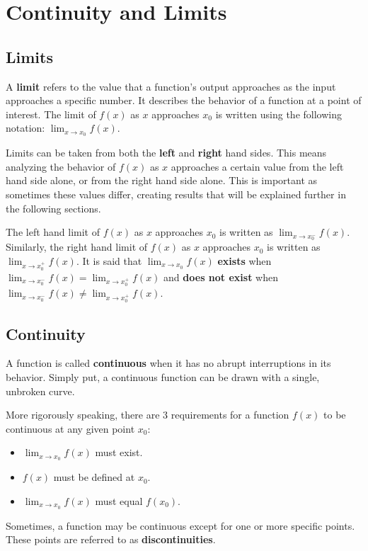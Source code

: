 \documentclass[11pt]{article}
\begin{document}
\section{Continuity and Limits}

\subsection{Limits}
A \textbf{limit} refers to the value that a function's output approaches as the input approaches a specific number. It describes the behavior of a function at a point of interest. The limit of $f(x)$ as $x$ approaches $x_0$ is written using the following notation: $\lim_{x\to x_0} f(x)$. 

Limits can be taken from both the \textbf{left} and \textbf{right} hand sides. This means analyzing the behavior of $f(x)$ as $x$ approaches a certain value from the left hand side alone, or from the right hand side alone. This is important as sometimes these values differ, creating results that will be explained further in the following sections. 

The left hand limit of $f(x)$ as $x$ approaches $x_0$ is written as $\lim_{x\to x_0^-} f(x)$. Similarly, the right hand limit of $f(x)$ as $x$ approaches $x_0$ is written as $\lim_{x\to x_0^+} f(x)$. It is said that $\lim_{x\to x_0} f(x)$ \textbf{exists} when $\lim_{x\to x_0^-} f(x) = \lim_{x\to x_0^+} f(x)$ and \textbf{does not exist} when $\lim_{x\to x_0^-} f(x) \neq \lim_{x\to x_0^+} f(x)$.

\subsection{Continuity}
A function is called \textbf{continuous} when it has no abrupt interruptions in its behavior. Simply put, a continuous function can be drawn with a single, unbroken curve. 

More rigorously speaking, there are 3 requirements for a function $f(x)$ to be continuous at any given point $x_0$: 
\begin{itemize}
  \item $\lim_{x\to x_0} f(x)$ must exist.
  \item $f(x)$ must be defined at $x_0$.
  \item $\lim_{x\to x_0} f(x)$ must equal $f(x_0)$.
\end{itemize}

Sometimes, a function may be continuous except for one or more specific points. These points are referred to as \textbf{discontinuities}.
\end{document}
